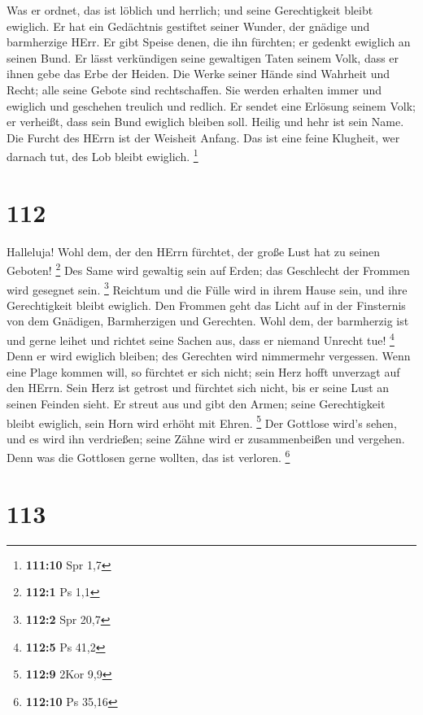  Was er ordnet, das ist löblich und herrlich; und seine
Gerechtigkeit bleibt ewiglich.  Er hat ein Gedächtnis
gestiftet seiner Wunder, der gnädige und barmherzige HErr. 
Er gibt Speise denen, die ihn fürchten; er gedenkt ewiglich an seinen
Bund.  Er lässt verkündigen seine gewaltigen Taten seinem
Volk, dass er ihnen gebe das Erbe der Heiden.  Die Werke
seiner Hände sind Wahrheit und Recht; alle seine Gebote sind
rechtschaffen.  Sie werden erhalten immer und ewiglich und
geschehen treulich und redlich.  Er sendet eine Erlösung
seinem Volk; er verheißt, dass sein Bund ewiglich bleiben soll. Heilig
und hehr ist sein Name.  Die Furcht des HErrn ist der
Weisheit Anfang. Das ist eine feine Klugheit, wer darnach tut, des Lob
bleibt ewiglich. \footnote{\textbf{111:10} Spr 1,7}

\hypertarget{section-35}{%
\section{112}\label{section-35}}

 Halleluja! Wohl dem, der den HErrn fürchtet, der große Lust
hat zu seinen Geboten! \footnote{\textbf{112:1} Ps 1,1}  Des
Same wird gewaltig sein auf Erden; das Geschlecht der Frommen wird
gesegnet sein. \footnote{\textbf{112:2} Spr 20,7}  Reichtum
und die Fülle wird in ihrem Hause sein, und ihre Gerechtigkeit bleibt
ewiglich.  Den Frommen geht das Licht auf in der Finsternis
von dem Gnädigen, Barmherzigen und Gerechten.  Wohl dem, der
barmherzig ist und gerne leihet und richtet seine Sachen aus, dass er
niemand Unrecht tue! \footnote{\textbf{112:5} Ps 41,2}  Denn
er wird ewiglich bleiben; des Gerechten wird nimmermehr vergessen.
 Wenn eine Plage kommen will, so fürchtet er sich nicht;
sein Herz hofft unverzagt auf den HErrn.  Sein Herz ist
getrost und fürchtet sich nicht, bis er seine Lust an seinen Feinden
sieht.  Er streut aus und gibt den Armen; seine
Gerechtigkeit bleibt ewiglich, sein Horn wird erhöht mit Ehren.
\footnote{\textbf{112:9} 2Kor 9,9}  Der Gottlose wird's
sehen, und es wird ihn verdrießen; seine Zähne wird er zusammenbeißen
und vergehen. Denn was die Gottlosen gerne wollten, das ist verloren.
\footnote{\textbf{112:10} Ps 35,16}

\hypertarget{section-36}{%
\section{113}\label{section-36}}


